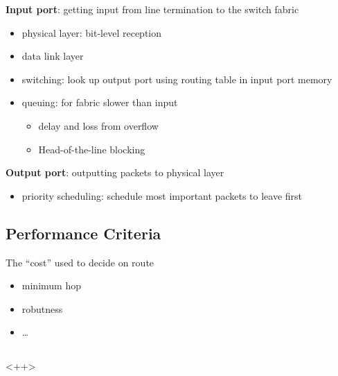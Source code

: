 \documentclass[]{article}
\theoremstyle{definition}
\begin{document}
	\textbf{Input port}: getting input from line termination to the switch fabric
	\begin{itemize}
		\item physical layer: bit-level reception
		\item data link layer
		\item switching: look up output port using routing table in input port memory 	
		\item queuing: for fabric slower than input
			\begin{itemize}
				\item delay and loss from overflow
				\item Head-of-the-line blocking
			\end{itemize}
	\end{itemize}

	\textbf{Output port}: outputting packets to physical layer
	\begin{itemize}
		\item priority scheduling: schedule most important packets to leave first 
	\end{itemize}

	\subsection{Performance Criteria}
	The ``cost'' used to decide on route
	\begin{itemize}
		\item minimum hop
		\item robutness
		\item \dots
	\end{itemize}

	\subsection{}<++>
\end{document}
